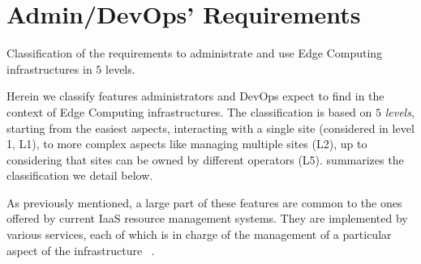 
\section{Admin/DevOps' Requirements}
\label{sec:requirements}

%   

\begin{table*}
    \centering
        
    \caption{Classification of the requirements to administrate and use Edge
    Computing infrastructures in $5$ levels.}
    \label{tab:requirements}
\end{table*}

Herein we classify features administrators and DevOps expect
to find in the context of Edge Computing infrastructures.
The classification is based on $5$ \emph{levels}, starting from the easiest
aspects, \ie interacting with a single site (considered in level 1, L1), to
more complex aspects like managing multiple sites (L2), up to considering that
sites can be owned by different operators (L5).
 summarizes the classification we detail below.

As previously mentioned, a large part of these features are common to
the ones offered by current IaaS resource management systems. They are
implemented by various services, each of which is in charge of the
management of a particular aspect of the infrastructure
~\cite{moreno2012csp}.

